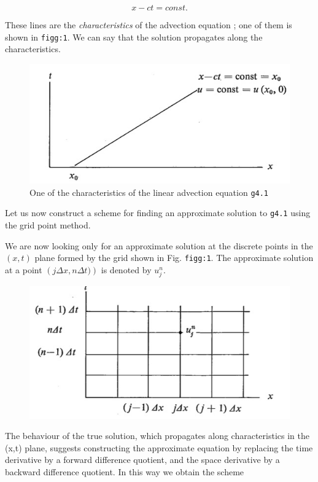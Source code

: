 \[x - ct = const.\]

These lines are the \emph{characteristics} of the advection equation ;
one of them is shown in \texttt{figg:1}. We can say that the solution
propagates along the characteristics.

\begin{figure}
    \centering
    \includegraphics[width=0.8\linewidth,height=\textheight,width = .7 \textwidth]{figs/NM/pic1.jpg}
    \caption{One of the characteristics of the linear advection equation
    \texttt{g4.1}}
\end{figure}

Let us now construct a scheme for finding an approximate solution to
\texttt{g4.1} using the grid point method.

We are now looking only for an approximate solution at the discrete
points in the \((x,t)\) plane formed by the grid shown in Fig.
\texttt{figg:1}. The approximate solution at a point
\(\left( j\Delta x, n\Delta t) \right)\) is denoted by \(u_{j}^{n}\).

\begin{figure}
    \centering
    \includegraphics[width = .7 \textwidth]{figs/NM/pic2.jpg}
    \caption{} \label{fig:}
\end{figure}

The behaviour of the true solution, which propagates along
characteristics in the (x,t) plane, suggests constructing the
approximate equation by replacing the time derivative by a forward
difference quotient, and the space derivative by a backward difference
quotient. In this way we obtain the scheme

